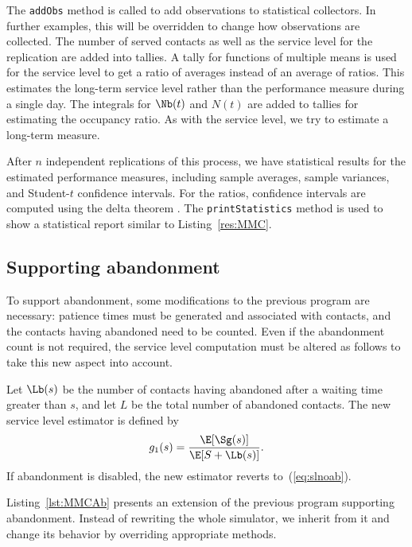 The \texttt{addObs} method is called to add observations to
statistical collectors.  In further examples, this will be overridden
to change how observations are collected.
The number of served contacts as well as the service level for the
replication are added into tallies.  A tally for functions of multiple means is used for the
service level to get a ratio of averages instead of an average of ratios.
This estimates the long-term service level rather than the performance
measure during a single day.
The integrals for $\Nb(t)$ and
$N(t)$ are added to tallies for estimating the occupancy ratio.
As with the service level, we
try to estimate a long-term measure.

After $n$ independent replications of this process, we have
statistical results for the estimated performance measures, including
sample averages, sample variances, and Student-$t$ confidence
intervals.  For the ratios, confidence intervals are computed using
the delta theorem \cite{tSER80a}.  The \texttt{print\-Statistics}
method is used to show a statistical report similar to Listing~\ref{res:MMC}.



\subsection{Supporting abandonment}

To support abandonment, some modifications to the previous program are
necessary: patience times must be generated and associated with
contacts, and the contacts having abandoned need to be counted.  Even
if the abandonment count is not required, the service level
computation must be
altered as follows to take this new aspect into account.

Let $\Lb(s)$ be the number of
contacts having abandoned after a waiting time greater than $s$, and
let $L$ be the total number of abandoned contacts.  The new service
level estimator is defined by
\begin{equation}
g_1(s)=\frac{\E[\Sg(s)]}{\E[S + \Lb(s)]}.\label{eq:slab}
\end{equation}
If abandonment is disabled, the new estimator reverts
to~(\ref{eq:slnoab}).

Listing~\ref{lst:MMCAb} presents an extension of the previous
program supporting abandonment.  Instead of rewriting the whole
simulator, we inherit from it and change its behavior by overriding
appropriate methods.


